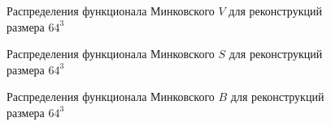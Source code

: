 			\begin{figure}[h]
				\begin{minipage}[h]{0.49\linewidth}
				\end{minipage}
				\hfill
				\begin{minipage}[h]{0.49\linewidth}
				\end{minipage}
				\caption{Распределения функционала Минковского $V$ для реконструкций размера $64^3$}
				\label{5-dist-V-64}
			\end{figure}
		
			\begin{figure}[h]
				\begin{minipage}[h]{0.49\linewidth}
				\end{minipage}
				\hfill
				\begin{minipage}[h]{0.49\linewidth}
				\end{minipage}
				\caption{Распределения функционала Минковского $S$ для реконструкций размера $64^3$}
				\label{5-dist-S-64}
			\end{figure}
		
			\begin{figure}[h]
				\begin{minipage}[h]{0.49\linewidth}
				\end{minipage}
				\hfill
				\begin{minipage}[h]{0.49\linewidth}
				\end{minipage}
				\caption{Распределения функционала Минковского $B$ для реконструкций размера $64^3$}
				\label{5-dist-B-64}
			\end{figure}
		
